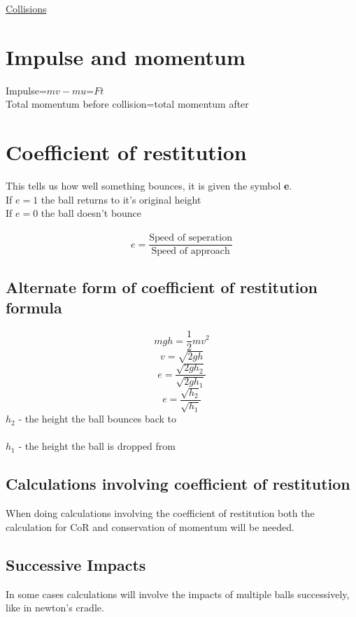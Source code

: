 \documentclass{article}[18pt]
\begin{document}
\begin{center}
\underline{\huge Collisions}
\end{center}
\section{Impulse and momentum}
Impulse=$mv-mu$=$Ft$\\
Total momentum before collision=total momentum after
\section{Coefficient of restitution}
This tells us how well something bounces, it is given the symbol \textbf{e}.\\
If $e=1$ the ball returns to it's original height\\
If $e=0$ the ball doesn't bounce\\
\\
$$e=\frac{\text{Speed of seperation}}{\text{Speed of approach}}$$
\subsection{Alternate form of coefficient of restitution formula}
$$mgh=\frac{1}{2}mv^2$$
$$v=\sqrt{2gh}$$
$$e=\dfrac{\sqrt{2gh_2}}{\sqrt{2gh_1}}$$
$$e=\dfrac{\sqrt{h_2}}{\sqrt{h_1}}$$
$h_2$ - the height the ball bounces back to\\
\\
$h_1$ - the height the ball is dropped from
\subsection{Calculations involving coefficient of restitution}
When doing calculations involving the coefficient of restitution both the calculation for CoR and conservation of momentum will be needed.
\subsection{Successive Impacts}
In some cases calculations will involve the impacts of multiple balls successively, like in newton's cradle.
\newpage
\end{document}
